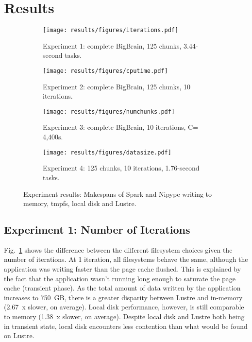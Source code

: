 \documentclass{IEEEtran}
\begin{document}


\section{Results} %
\label{sec:results}


\begin{figure*}
\begin{subfigure}{\columnwidth}
    \centering
    \texttt{[image: results/figures/iterations.pdf]}
    \caption{Experiment 1: complete BigBrain, 125 chunks, 3.44-second tasks.}\label{fig:iterations}
\end{subfigure}
\begin{subfigure}{\columnwidth}
    \centering
    \texttt{[image: results/figures/cputime.pdf]}
    \caption{Experiment 2: complete BigBrain, 125 chunks, 10 iterations.}\label{fig:cputime}
\end{subfigure}
\begin{subfigure}{\columnwidth}
    \centering
    \texttt{[image: results/figures/numchunks.pdf]}
    \caption{Experiment 3: complete BigBrain, 10 iterations, C= 4,400s.}\label{fig:numchunks}
\end{subfigure}
\begin{subfigure}{\columnwidth}
    \centering
    \texttt{[image: results/figures/datasize.pdf]}
    \caption{Experiment 4: 125 chunks, 10 iterations, 1.76-second tasks.}\label{fig:datasize}
\end{subfigure}
\caption{Experiment results: Makespans of Spark and Nipype writing to memory, tmpfs, local  disk and Lustre.}
\end{figure*}
\subsection{Experiment 1: Number of Iterations}

Fig.~\ref{fig:iterations} shows the difference between the different 
filesystem choices given the number of iterations. At 1 iteration, all 
filesystems behave the same, although the application was writing faster than the page cache flushed.
This is explained by the fact that the application wasn't running long enough to saturate the page 
cache (transient phase). As the total amount of data written by the 
application increases to 750~GB, there is a greater disparity between 
Lustre and in-memory (2.67~x slower, on average). Local disk 
performance, however, 
is still comparable to memory (1.38~x slower, on average). Despite local disk and 
Lustre both being in transient state, local disk encounters less contention 
than what would be found on Lustre. 
\end{document}
